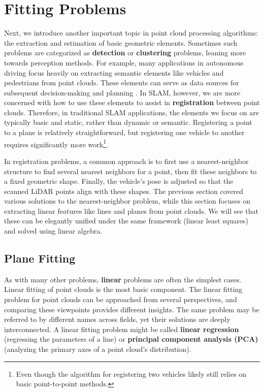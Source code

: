 \section{Fitting Problems}
Next, we introduce another important topic in point cloud processing algorithms: the extraction and estimation of basic geometric elements. Sometimes such problems are categorized as \textbf{detection} or \textbf{clustering} problems, leaning more towards perception methods. For example, many applications in autonomous driving focus heavily on extracting semantic elements like vehicles and pedestrians from point clouds. These elements can serve as data sources for subsequent decision-making and planning \cite{Navarro-Serment2010}. In SLAM, however, we are more concerned with how to use these elements to assist in \textbf{registration} between point clouds. Therefore, in traditional SLAM applications, the elements we focus on are typically basic and static, rather than dynamic or semantic. Registering a point to a plane is relatively straightforward, but registering one vehicle to another requires significantly more work\footnote{Even though the algorithm for registering two vehicles likely still relies on basic point-to-point methods.}.

In registration problems, a common approach is to first use a nearest-neighbor structure to find several nearest neighbors for a point, then fit these neighbors to a fixed geometric shape. Finally, the vehicle's pose is adjusted so that the scanned LiDAR points align with these shapes. The previous section covered various solutions to the nearest-neighbor problem, while this section focuses on extracting linear features like lines and planes from point clouds. We will see that these can be elegantly unified under the same framework (linear least squares) and solved using linear algebra.

\subsection{Plane Fitting}
As with many other problems, \textbf{linear} problems are often the simplest cases. Linear fitting of point clouds is the most basic component. The linear fitting problem for point clouds can be approached from several perspectives, and comparing these viewpoints provides different insights. The same problem may be referred to by different names across fields, yet their solutions are deeply interconnected. A linear fitting problem might be called \textbf{linear regression} (regressing the parameters of a line) or \textbf{principal component analysis (PCA)} (analyzing the primary axes of a point cloud's distribution).

